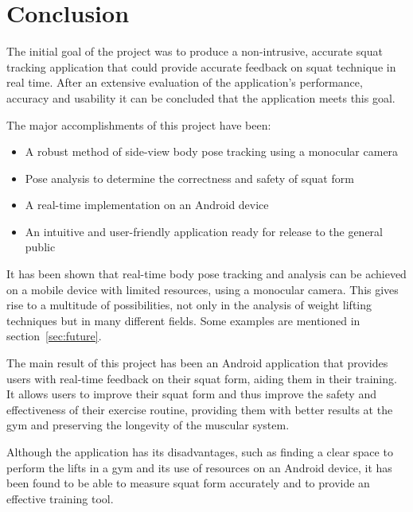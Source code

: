 \section{Conclusion}

The initial goal of the project was to produce a non-intrusive, accurate squat tracking application that could provide accurate feedback on squat technique in real time. After an extensive evaluation of the application's performance, accuracy and usability it can be concluded that the application meets this goal.

The major accomplishments of this project have been:

\begin{itemize}
	\item A robust method of side-view body pose tracking using a monocular camera
	\item Pose analysis to determine the correctness and safety of squat form
	\item A real-time implementation on an Android device
	\item An intuitive and user-friendly application ready for release to the general public
\end{itemize}

It has been shown that real-time body pose tracking and analysis can be achieved on a mobile device with limited resources, using a monocular camera. This gives rise to a multitude of possibilities, not only in the analysis of weight lifting techniques but in many different fields. Some examples are mentioned in section~\ref{sec:future}.

The main result of this project has been an Android application that provides users with real-time feedback on their squat form, aiding them in their training. It allows users to improve their squat form and thus improve the safety and effectiveness of their exercise routine, providing them with better results at the gym and preserving the longevity of the muscular system.

Although the application has its disadvantages, such as finding a clear space to perform the lifts in a gym and its use of resources on an Android device, it has been found to be able to measure squat form accurately and to provide an effective training tool.